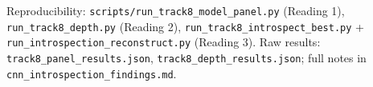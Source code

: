 \documentclass{article}
\begin{document}
\begin{ack}
Reproducibility: \texttt{scripts/run\_track8\_model\_panel.py} (Reading 1),
\texttt{run\_track8\_depth.py} (Reading 2), \texttt{run\_track8\_introspect\_best.py} +
\texttt{run\_introspection\_reconstruct.py} (Reading 3). Raw results:
\texttt{track8\_panel\_results.json}, \texttt{track8\_depth\_results.json}; full notes in
\texttt{cnn\_introspection\_findings.md}.
\end{ack}



\end{document}
